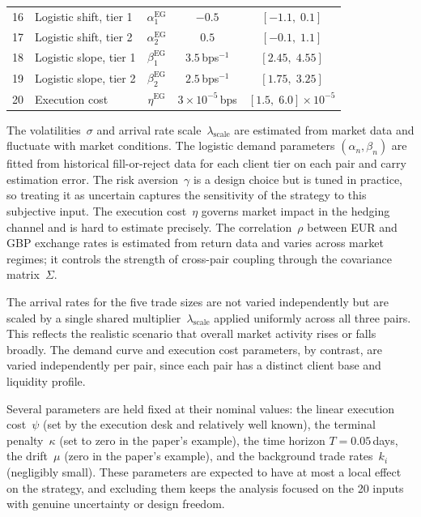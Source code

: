 \begin{table}[ht]
\begin{tabular}{@{}clccc@{}}
16 & Logistic shift, tier 1 & $\alpha_1^{\text{EG}}$ & $-0.5$ & $[-1.1,\; 0.1]$ \\
17 & Logistic shift, tier 2 & $\alpha_2^{\text{EG}}$ & $0.5$ & $[-0.1,\; 1.1]$ \\
18 & Logistic slope, tier 1 & $\beta_1^{\text{EG}}$ & $3.5$\,bps$^{-1}$ & $[2.45,\; 4.55]$ \\
19 & Logistic slope, tier 2 & $\beta_2^{\text{EG}}$ & $2.5$\,bps$^{-1}$ & $[1.75,\; 3.25]$ \\
20 & Execution cost & $\eta^{\text{EG}}$ & $3 \times 10^{-5}$\,bps & $[1.5,\; 6.0] \times 10^{-5}$ \\
\bottomrule
\end{tabular}
\end{table}

The volatilities~$\sigma$ and arrival rate scale~$\lambda_{\text{scale}}$ are estimated from market data and fluctuate with market conditions. The logistic demand parameters $(\alpha_n, \beta_n)$ are fitted from historical fill-or-reject data for each client tier on each pair and carry estimation error. The risk aversion~$\gamma$ is a design choice but is tuned in practice, so treating it as uncertain captures the sensitivity of the strategy to this subjective input. The execution cost~$\eta$ governs market impact in the hedging channel and is hard to estimate precisely. The correlation~$\rho$ between EUR and GBP exchange rates is estimated from return data and varies across market regimes; it controls the strength of cross-pair coupling through the covariance matrix~$\Sigma$.

The arrival rates for the five trade sizes are not varied independently but are scaled by a single shared multiplier~$\lambda_{\text{scale}}$ applied uniformly across all three pairs. This reflects the realistic scenario that overall market activity rises or falls broadly. The demand curve and execution cost parameters, by contrast, are varied independently per pair, since each pair has a distinct client base and liquidity profile.

Several parameters are held fixed at their nominal values: the linear execution cost~$\psi$ (set by the execution desk and relatively well known), the terminal penalty~$\kappa$ (set to zero in the paper's example), the time horizon $T = 0.05$\,days, the drift~$\mu$ (zero in the paper's example), and the background trade rates~$k_i$ (negligibly small). These parameters are expected to have at most a local effect on the strategy, and excluding them keeps the analysis focused on the 20 inputs with genuine uncertainty or design freedom.


